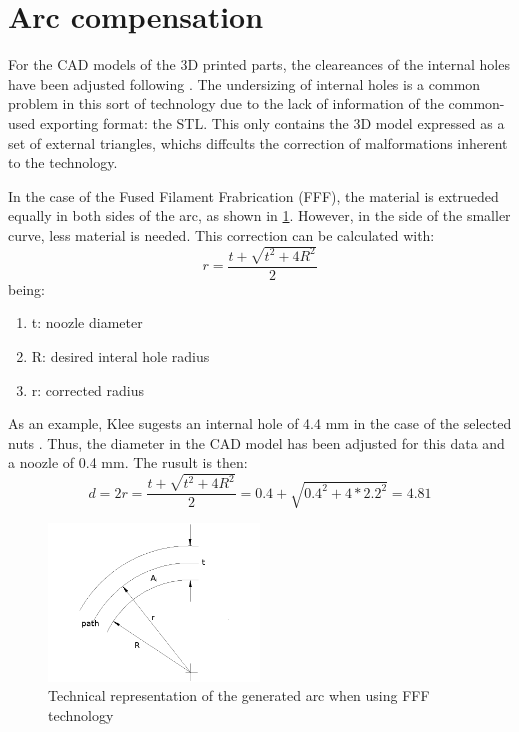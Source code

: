 
\section{Arc compensation} %
\label{sec:arc_compensation}

For the CAD models of the 3D printed parts, the cleareances of the internal holes have been adjusted following \cite{arc_compensation}.
The undersizing of internal holes is a common problem in this sort of technology due to the lack of information of the common-used exporting format: the STL.
This only contains the 3D model expressed as a set of external triangles, whichs diffcults the correction of malformations inherent to the technology.

In the case of the Fused Filament Frabrication (FFF), the material is extrueded equally in both sides of the arc, as shown in \ref{fig:arc_compensation}. 
However, in the side of the smaller curve, less material is needed.
This correction can be calculated with:
$$ r=\frac{t+\sqrt{t^2+4R^2}}{2}$$
being:
\begin{enumerate}
  \item t: noozle diameter
  \item R: desired interal hole radius
  \item r: corrected radius
\end{enumerate}
As an example, Klee sugests an internal hole of 4.4 mm in the case of the selected nuts \cite{klee}. Thus, the diameter in the CAD model has been adjusted for this data and a noozle of 0.4 mm. The rusult is then:
$$ d=2r=\frac{t+\sqrt{t^2+4R^2}}{2}=0.4+\sqrt{0.4^2+4*2.2^2}=4.81$$

\begin{figure}[tb]
  \centering
  \includegraphics[width=0.5\textwidth]{figures/Arc-compensation}
  \caption{Technical representation of the generated arc when using FFF technology}
  \label{fig:arc_compensation}
\end{figure}

